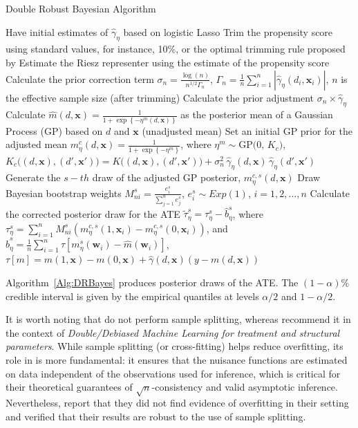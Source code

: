 \begin{algorithm}[h!]
	\caption{Double Robust Bayesian Algorithm}\label{Alg:DRBayes}
	\begin{algorithmic}[1]
		\State Have initial estimates of $\hat{\gamma}_{\eta}$ based on logistic Lasso
		\State Trim the propensity score using standard values, for instance, 10\%, or the optimal trimming rule proposed by \cite{Crump2009Overlap}
		\State Estimate the Riesz representer using the estimate of the propensity score 
		\State Calculate the prior correction term $\sigma_n=\frac{\log(n)}{n^{1/2}\Gamma_n}$, $\Gamma_n=\frac{1}{n}\sum_{i=1}^n |\hat{\gamma}_{\eta}(d_i,\mathbf{x}_i)|$, $n$ is the effective sample size (after trimming)
		\State Calculate the prior adjustment $\sigma_n\times \hat{\gamma}_{\eta}$ 
		\State Calculate $\hat{m}(d,\mathbf{x})=\frac{1}{1+\exp\left\{-\eta^m(d,\mathbf{x})\right\}}$ as the posterior mean of a Gaussian Process (GP) based on $d$ and $\mathbf{x}$ (unadjusted mean)
		\State Set an initial GP prior for  the adjusted mean $m_{\eta}^c(d,\mathbf{x})=\frac{1}{1+\exp\left\{-\eta^m\right\}}$, where $\eta^m \sim \mathrm{GP}\!\big(0,\, K_c\big)$, $K_c\big((d,\mathbf{x}),(d',\mathbf{x}')\big)
		= K\big((d,\mathbf{x}),(d',\mathbf{x}')\big)
		+ \sigma_n^2\,\widehat{\gamma}_\eta(d,\mathbf{x})\,
		\widehat{\gamma}_\eta(d',\mathbf{x}')$ 		 			
		\State Generate the $s-th$ draw of the adjusted GP posterior, $m_{\eta}^{c,s}(d,\mathbf{x})$
		\State Draw Bayesian bootstrap weights $M^s_{ni}=\frac{e_i^s}{\sum_{j=1}^n e_j^s}$, $e_i^s\sim Exp(1)$, $i=1,2,\dots,n$
		\State Calculate the corrected posterior draw for the ATE $\tilde{\tau}_{\eta}^s=\tau_{\eta}^s-\hat{b}_{\eta}^s$, where $\tau_{\eta}^s=\sum_{i=1}^n M^s_{ni}(m_{\eta}^{c,s}(1,\mathbf{x}_i)-m_{\eta}^{c,s}(0,\mathbf{x}_i))$, and $\hat{b}_{\eta}^s=\frac{1}{n}\sum_{i=1}^n\tau[m_{\eta}^s(\mathbf{w}_i)-\hat{m}(\mathbf{w}_i)]$, $\tau[m]=m(1,\mathbf{x})-m(0,\mathbf{x})+\hat{\gamma}(d,\mathbf{x})(y-m(d,\mathbf{x}))$ 
		\EndFor 
	\end{algorithmic} 
\end{algorithm}      
 
Algorithm~\ref{Alg:DRBayes} produces posterior draws of the ATE. The $(1-\alpha)\%$ credible interval is given by the empirical quantiles at levels $\alpha/2$ and $1-\alpha/2$. 

It is worth noting that \cite{breunig2025double} do not perform sample splitting, whereas \cite{chernozhukov2018double} recommend it in the context of \textit{Double/Debiased Machine Learning for treatment and structural parameters}. While sample splitting (or cross-fitting) helps reduce overfitting, its role in \cite{chernozhukov2018double} is more fundamental: it ensures that the nuisance functions are estimated on data independent of the observations used for inference, which is critical for their theoretical guarantees of $\sqrt{n}$-consistency and valid asymptotic inference. Nevertheless, \cite{breunig2025double} report that they did not find evidence of overfitting in their setting and verified that their results are robust to the use of sample splitting.


